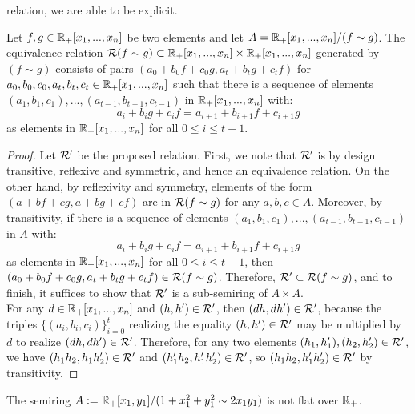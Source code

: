 relation, we are able to be explicit.
\begin{proposition}\label{prop:quotientrels}
Let $f,g \in \bb{R}_{+}[x_1,...,x_n]$ be two elements and let $A=\bb{R}_{+}[x_1,...,x_n]/(f \sim g)$. The equivalence 
relation $\cal{R}(f \sim g) \subset \bb{R}_{+}[x_1,...,x_n] \times \bb{R}_{+}[x_1,...,x_n]$ 
generated by $(f \sim g)$ consists of pairs $(a_0 + b_0f + c_0g, a_t + b_tg + c_tf)$ for $a_0,b_0,c_0, a_t,b_t,c_t \in \bb{R}_{+}[x_1,...,x_n]$
such that there is a sequence of elements $(a_1,b_1,c_1),...,(a_{t-1},b_{t-1},c_{t-1})$ in $\bb{R}_{+}[x_1,...,x_n]$ with:
\[a_{i} + b_{i}g + c_{i}f=a_{i+1} + b_{i+1}f + c_{i+1}g \]
as elements in $\bb{R}_{+}[x_1,...,x_n]$ for all $0 \le i \le t-1$.
\end{proposition}
\begin{proof}
Let $\cal{R}'$ be the proposed relation. First, we note that $\cal{R}'$ is by design transitive, reflexive and symmetric, and hence an equivalence relation.
On the other hand, by reflexivity and symmetry, elements of the form $(a + bf + cg, a + bg + cf)$ are in $\cal{R}(f \sim g)$ for any $a,b,c \in A$.
Moreover, by transitivity, if there is a sequence of elements $(a_1,b_1,c_1),...,(a_{t-1},b_{t-1},c_{t-1})$ in $A$ with:
\[a_{i} + b_{i}g + c_{i}f= a_{i+1} + b_{i+1}f + c_{i+1}g\]
as elements in $\bb{R}_{+}[x_1,...,x_n]$ for all $0 \le i \le t-1$, then $(a_0 + b_0f + c_0g, a_t + b_tg + c_tf) \in \cal{R}(f\sim g)$. Therefore, $\cal{R}' \subset \cal{R}(f \sim g)$, and to finish,
 it suffices to show that $\cal{R}'$ is a sub-semiring of $A \times A$.\\
\indent For any $d \in \bb{R}_{+}[x_1,...,x_n]$ and $(h,h') \in \cal{R}'$, then $(dh,dh')\in \cal{R}'$, because the triples $\{(a_i,b_i,c_i)\}_{i=0}^t$
realizing the equality $(h,h')\in \cal{R}'$ may be multiplied by $d$ to realize $(dh,dh') \in \cal{R}'$. Therefore, for any two elements
$(h_1,h'_1), (h_2,h'_2) \in \cal{R}'$, we have $(h_1h_2,h_1h'_2) \in \cal{R}'$ and $(h'_1h_2,h'_1h'_2) \in \cal{R}'$, 
so $(h_1h_2,h'_1h'_2) \in \cal{R}'$
by transitivity. 
\end{proof}
\begin{corollary}\label{cor:univpointless}
The semiring $A:=\bb{R}_{+}[x_1,y_1]/(1+x_1^2+y_1^2 \sim 2x_1y_1)$ is not flat over $\bb{R}_{+}$.
\end{corollary}

